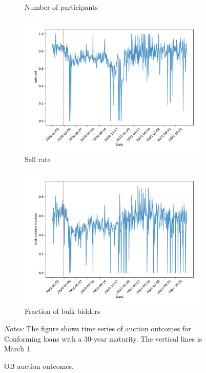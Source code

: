 \documentclass[11pt,a4paper]{article}
\begin{document}
\begin{figure}[h]
\begin{subfigure}[b]{0.49\textwidth}
      \caption{ Number of participants}
     \end{subfigure}
     \begin{subfigure}[b]{0.49\textwidth}
      \includegraphics[width=0.998\textwidth]{../results/figures/dummy_sell_any_mean_mat30_loan1_timeseries_nr_1_7.pdf}
      \caption{ Sell rate}
     \end{subfigure}
     \begin{subfigure}[b]{0.49\textwidth}
      \includegraphics[width=0.998\textwidth]{../results/figures/bulk_bidders_fraction_mean_mat30_loan1_timeseries_nr_1_7.pdf}
      \caption{ Fraction of bulk bidders}
     \end{subfigure}
     \caption{OB auction outcomes. } 
   \begin{minipage}{\textwidth}
      \footnotesize{\textit{Notes:} The figure shows time series of auction outcomes for Conforming loans with a 30-year maturity. The vertical lines is March 1.  } 
      \end{minipage}
\end{figure}
\end{document}
